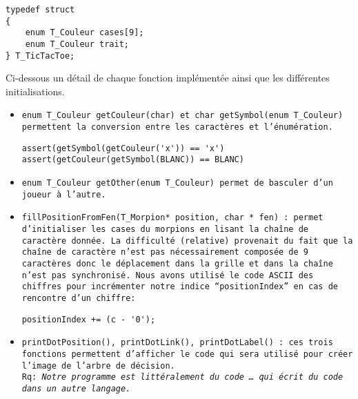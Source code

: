 \documentclass[14pt,a4paper]{article}
\begin{document}

\begin{lstlisting}
typedef struct
{
    enum T_Couleur cases[9];
    enum T_Couleur trait;
} T_TicTacToe;    
\end{lstlisting}

Ci-dessous un détail de chaque fonction implémentée ainsi que les différentes initialisations.\\

\begin{itemize}[label=-]

\item\tt{enum T\_Couleur getCouleur(char)} et \tt{char getSymbol(enum T\_Couleur)} permettent la conversion entre les caractères et l'énumération.

\begin{lstlisting}
assert(getSymbol(getCouleur('x')) == 'x')
assert(getCouleur(getSymbol(BLANC)) == BLANC)
\end{lstlisting}

\item\tt{enum T\_Couleur getOther(enum T\_Couleur)} permet de basculer d'un joueur à l'autre.\\

\item\tt{fillPositionFromFen(T\_Morpion* position, char * fen)} : permet d'initialiser les cases du morpions en lisant la chaîne de caractère donnée. La difficulté (relative) provenait du fait que la chaîne de caractère n'est pas nécessairement composée de 9 caractères donc le déplacement dans la grille et dans la chaîne n'est pas synchronisé. Nous avons utilisé le code ASCII des chiffres pour incrémenter notre indice “positionIndex” en cas de rencontre d'un chiffre\footnotemark :


\begin{lstlisting}
positionIndex += (c - '0');
\end{lstlisting}

\item\tt{printDotPosition()}, \tt{printDotLink()}, \tt{printDotLabel()} : ces trois fonctions permettent d'afficher le code qui sera utilisé pour créer l'image de l'arbre de décision.\\
\indent Rq: \emph{Notre programme est littéralement du code … qui écrit du code dans un autre langage.}\\


\end{itemize}
\end{document}
